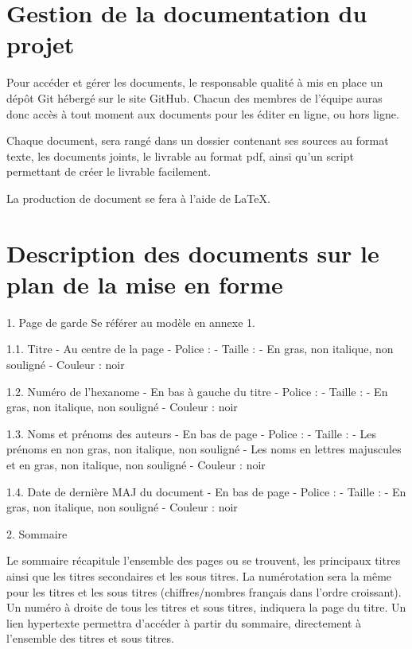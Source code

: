 \section{Gestion de la documentation du projet}

Pour accéder et gérer les documents, le responsable qualité à mis en place un dépôt Git hébergé sur le site GitHub.
Chacun des membres de l’équipe auras donc accès à tout moment aux documents pour les éditer en ligne, ou hors ligne.


Chaque document, sera rangé dans un dossier contenant ses sources au format texte, les documents joints, le livrable au format pdf, ainsi qu'un script permettant de créer le livrable facilement.

La production de document se fera à l’aide de LaTeX.


\section{Description des documents sur le plan de la mise en forme}


1. Page de garde
   Se référer au modèle en annexe 1.

   1.1. Titre
        - Au centre de la page
        - Police : 
        - Taille : 
        - En gras, non italique, non souligné
        - Couleur : noir

   1.2. Numéro de l'hexanome
        - En bas à gauche du titre
        - Police : 
        - Taille : 
        - En gras, non italique, non souligné
        - Couleur : noir

   1.3. Noms et prénoms des auteurs
        - En bas de page
        - Police : 
        - Taille : 
        - Les prénoms en non gras, non italique, non souligné
        - Les noms en lettres majuscules et en gras, non italique, non souligné
        - Couleur : noir

   1.4. Date de dernière MAJ du document
        - En bas de page
        - Police : 
        - Taille : 
        - En gras, non italique, non souligné
        - Couleur : noir

2. Sommaire
  
   Le sommaire récapitule l'ensemble des pages ou se trouvent,
les principaux titres ainsi que les titres secondaires et les sous titres.
   La numérotation sera la même pour les titres et les sous titres (chiffres/nombres français
dans l'ordre croissant).
   Un numéro à droite de tous les titres et sous titres, indiquera la page du titre.
   Un lien hypertexte permettra d'accéder à partir du sommaire, directement à l'ensemble des titres
et sous titres.

